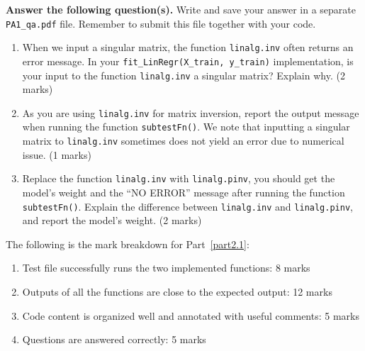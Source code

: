 \documentclass{article}
\theoremstyle{definition}
\begin{document}
\textbf{Answer the following question(s).} Write and save your answer in a separate \verb|PA1_qa.pdf| file. Remember
to submit this file together with your code.
\begin{enumerate}[label=\ref{part2.1}.\alph*)]
	\item When we input a singular matrix, the function \verb|linalg.inv| often returns an error message. In your
	\verb|fit_LinRegr(X_train, y_train)| implementation, is your input to the function \verb|linalg.inv| a
	singular matrix? Explain why. (2 marks)
	\item As you are using \verb|linalg.inv| for matrix inversion, report the output message when running the
	function \verb|subtestFn()|. We note that inputting a singular matrix to \verb|linalg.inv| sometimes does
	not yield an error due to numerical issue. (1 marks)
	\item Replace the function \verb|linalg.inv| with \verb|linalg.pinv|, you should get the model's weight and the
	``NO ERROR'' message after running the function \verb|subtestFn()|. Explain the difference between
	\verb|linalg.inv| and \verb|linalg.pinv|, and report the model's weight. (2 marks)
\end{enumerate}
The following is the mark breakdown for Part~\ref{part2.1}:
\begin{enumerate}[label=(\roman*)]
	\item Test file successfully runs the two implemented functions: 8 marks
	\item Outputs of all the functions are close to the expected output: 12 marks
	\item Code content is organized well and annotated with useful comments: 5 marks
	\item Questions are answered correctly: 5 marks
\end{enumerate}
\end{document}
